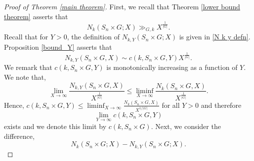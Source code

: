 \documentclass[11pt]{amsart}
\numberwithin{equation}{section}
\begin{document}
\begin{proof}[Proof of Theorem \ref{main theorem}]
    \par First, we recall that Theorem \ref{lower bound theorem} asserts that 
     \[  N_{k}(S_n\times G; X) \gg_{G, k} X^{\frac{1}{|G|}}.\] Recall that for $Y>0$, the definition of $N_{k,Y}(S_n\times G; X)$ is given in \eqref{N k y defn}. Proposition \ref{bound_Y} asserts that 
 \[
    N_{k,Y}(S_n\times G, X) \sim c(k, S_n\times G, Y)X^{\frac{1}{|G|}}.
    \]
    We remark that $c(k, S_n\times G, Y)$ is monotonically increasing as a function of $Y$. We note that,
    \begin{equation}\label{final eq}
        \lim_{X \to \infty}\frac{N_{k,Y}(S_n\times G, X)}{X^{\frac{1}{|G|}}} \leq \liminf_{X \to \infty}\frac{N_{k}(S_n\times G, X)}{X^{\frac{1}{|G|}}}.
    \end{equation}
    Hence, $c(k, S_n\times G, Y) \leq \liminf_{X \to \infty}\frac{N_{k}(S_n\times G, X)}{X^{1/|G|}}$ for all $Y > 0$ and therefore $$\lim_{Y \to \infty}c(k, S_n\times G, Y)$$ exists and we denote this limit by $c(k, S_n\times G)$.
Next, we consider the difference, 
\[N_{k}(S_n\times G; X)-N_{k, Y}(S_n\times G; X).\]
    

\end{proof}
\end{document}
